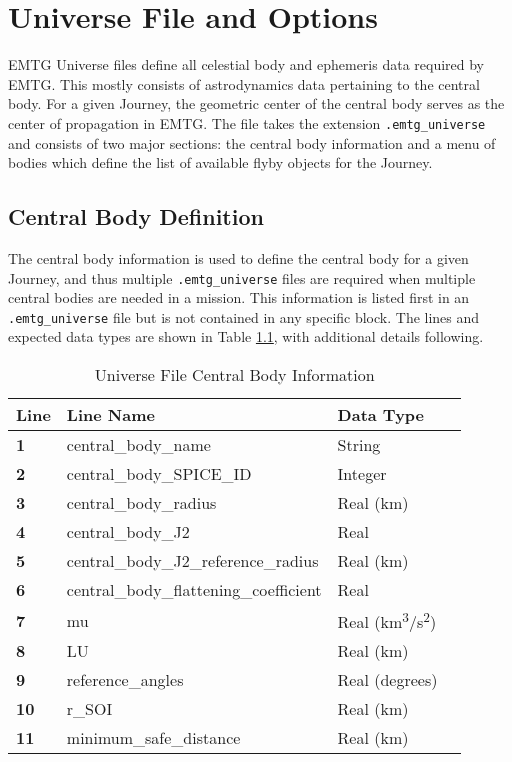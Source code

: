 \chapter{Universe File and Options}
\label{chap:universe_options}

\ac{EMTG} Universe files define all celestial body and ephemeris data required by \ac{EMTG}. This mostly consists of astrodynamics data pertaining to the central body. For a given Journey, the geometric center of the central body serves as the center of propagation in \ac{EMTG}. The file takes the extension {\tt .emtg\_universe} and consists of two major sections: the central body information and a menu of bodies which define the list of available flyby objects for the Journey. 

\section{Central Body Definition}
The central body information is used to define the central body for a given Journey, and thus multiple {\tt .emtg\_universe} files are required when multiple central bodies are needed in a mission. This information is listed first in an {\tt .emtg\_universe} file but is not contained in any specific block. The lines and expected data types are shown in Table \ref{tab:universe_centralbodyinfo}, with additional details following.

\begin{table}[H]
    \centering
    \begin{tabular}{llll}
    \hline
    \textbf{Line} & \textbf{Line Name} & \textbf{Data Type} \\
    \hline
    \textbf{1} & central\_body\_name & String \\
    \textbf{2} & central\_body\_SPICE\_ID & Integer \\
    \textbf{3} & central\_body\_radius & Real (km) \\
    \textbf{4} & central\_body\_J2 & Real \\
    \textbf{5} & central\_body\_J2\_reference\_radius & Real (km) \\
    \textbf{6} & central\_body\_flattening\_coefficient & Real \\
    \textbf{7} & mu & Real (km\textsuperscript{3}/s\textsuperscript{2}) \\
    \textbf{8} & LU & Real (km) \\
    \textbf{9} & reference\_angles & Real (degrees) \\
    \textbf{10} & r\_SOI & Real (km) \\
    \textbf{11} & minimum\_safe\_distance & Real (km)
    \end{tabular}
    \caption{Universe File Central Body Information}
    \label{tab:universe_centralbodyinfo}
\end{table}


